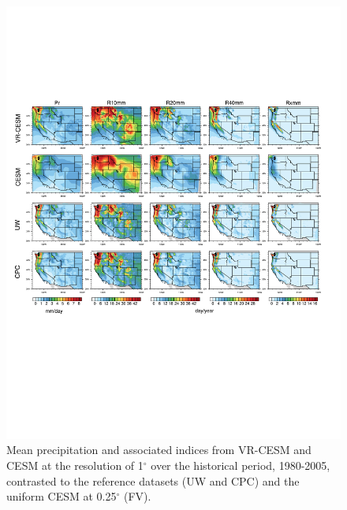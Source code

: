 \documentclass{ametsoc}
\begin{document}
\begin{figure}
\begin{center}
\includegraphics[width=6in]{wd_index_hist_vr_vs_1deg_cesm.pdf}
\caption{Mean precipitation and associated indices from VR-CESM and CESM at the resolution of 1$^\circ$ over the historical period, 1980-2005, contrasted to the reference datasets (UW and CPC) and the uniform CESM at 0.25$^\circ$ (FV).}
\end{center}
\label{fig:S4}
\end{figure}

\end{document}
